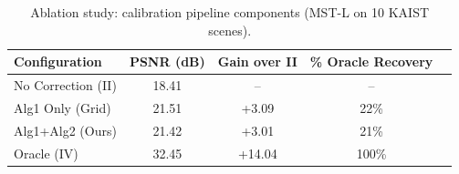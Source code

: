 \begin{table}[t]
\centering
\caption{Ablation study: calibration pipeline components (MST-L on 10 KAIST scenes).}
\label{tab:ablation}
\small
\begin{tabular}{l cccc}
\toprule
Configuration & PSNR (dB) & Gain over II & \% Oracle Recovery \\
\midrule
No Correction (II) & 18.41 & -- & -- \\
Alg1 Only (Grid) & 21.51 & +3.09 & 22\% \\
Alg1+Alg2 (Ours) & 21.42 & +3.01 & 21\% \\
Oracle (IV) & 32.45 & +14.04 & 100\% \\
\bottomrule
\end{tabular}
\end{table}